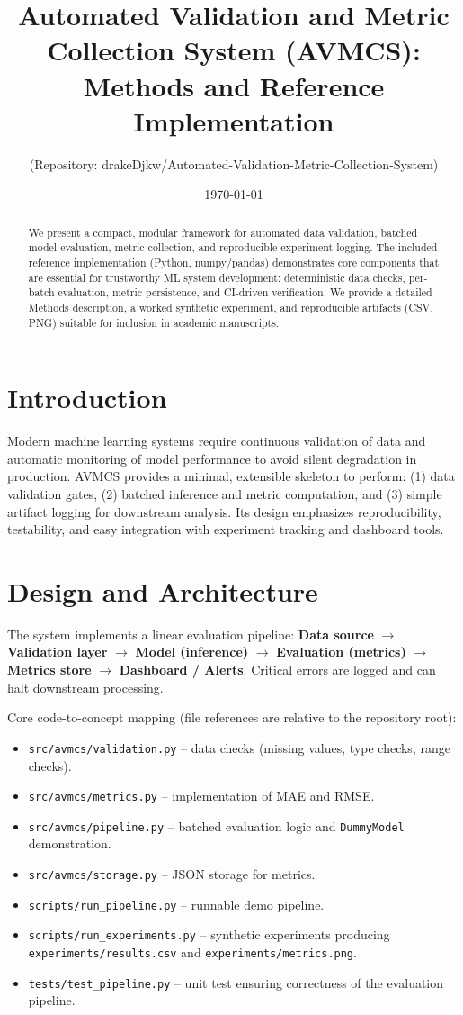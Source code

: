 \documentclass[11pt]{article}
\title{Automated Validation and Metric Collection System (AVMCS): \newline Methods and Reference Implementation}
\author{(Repository: drakeDjkw/Automated-Validation-Metric-Collection-System)}
\date{\today}
\begin{document}
\maketitle

\begin{abstract}
We present a compact, modular framework for automated data validation, batched model evaluation, metric collection, and reproducible experiment logging. The included reference implementation (Python, numpy/pandas) demonstrates core components that are essential for trustworthy ML system development: deterministic data checks, per-batch evaluation, metric persistence, and CI-driven verification. We provide a detailed Methods description, a worked synthetic experiment, and reproducible artifacts (CSV, PNG) suitable for inclusion in academic manuscripts.
\end{abstract}

\section{Introduction}
Modern machine learning systems require continuous validation of data and automatic monitoring of model performance to avoid silent degradation in production. AVMCS provides a minimal, extensible skeleton to perform: (1) data validation gates, (2) batched inference and metric computation, and (3) simple artifact logging for downstream analysis. Its design emphasizes reproducibility, testability, and easy integration with experiment tracking and dashboard tools.

\section{Design and Architecture}
The system implements a linear evaluation pipeline: \textbf{Data source} $\rightarrow$ \textbf{Validation layer} $\rightarrow$ \textbf{Model (inference)} $\rightarrow$ \textbf{Evaluation (metrics)} $\rightarrow$ \textbf{Metrics store} $\rightarrow$ \textbf{Dashboard / Alerts}. Critical errors are logged and can halt downstream processing.

Core code-to-concept mapping (file references are relative to the repository root):
\begin{itemize}
  \item \texttt{src/avmcs/validation.py} -- data checks (missing values, type checks, range checks).
  \item \texttt{src/avmcs/metrics.py} -- implementation of MAE and RMSE.
  \item \texttt{src/avmcs/pipeline.py} -- batched evaluation logic and \texttt{DummyModel} demonstration.
  \item \texttt{src/avmcs/storage.py} -- JSON storage for metrics.
  \item \texttt{scripts/run_pipeline.py} -- runnable demo pipeline.
  \item \texttt{scripts/run_experiments.py} -- synthetic experiments producing \texttt{experiments/results.csv} and \texttt{experiments/metrics.png}.
  \item \texttt{tests/test_pipeline.py} -- unit test ensuring correctness of the evaluation pipeline.
\end{itemize}
\end{document}

